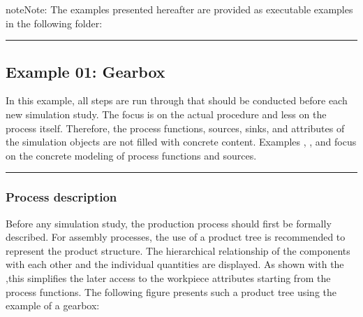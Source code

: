 \documentclass[letterpaper,10pt,english]{sphinxmanual}
\begin{document}
\begin{sphinxadmonition}{note}{Note:}
\sphinxAtStartPar
The examples presented hereafter are provided as executable examples in the following folder:

\begin{sphinxVerbatim}[commandchars=\\\{\}]
\end{sphinxVerbatim}
\end{sphinxadmonition}


\bigskip\hrule\bigskip



\subsection{Example 01: Gearbox}
\label{\detokenize{source/Examples/example01:example-01-gearbox}}\label{\detokenize{source/Examples/example01:id1}}\label{\detokenize{source/Examples/example01::doc}}
\sphinxAtStartPar
In this example, all steps are run through that should be conducted before each new simulation study. The focus is on
the actual procedure and less on the process itself. Therefore, the process functions, sources, sinks, and attributes of
the simulation objects are not filled with concrete content. Examples  {\hyperref[\detokenize{source/Examples/example02:id1}]{}}, {\hyperref[\detokenize{source/Examples/example03:id1}]{}}, and
{\hyperref[\detokenize{source/Examples/example04:id1}]{}} focus on the concrete modeling of process functions and sources.


\bigskip\hrule\bigskip



\subsubsection{Process description}
\label{\detokenize{source/Examples/example01:process-description}}
\sphinxAtStartPar
Before any simulation study, the production process should first be formally described. For assembly processes, the use
of a product tree is recommended to represent the product structure. The hierarchical relationship of the components
with each other and the individual quantities are displayed. As shown with the
{\hyperref[\detokenize{source/Interface_files/function_file:process-function}]{}},this simplifies the later access to the workpiece attributes starting from
the process functions. The following figure presents such a product tree using the example of a gearbox:
\end{document}
